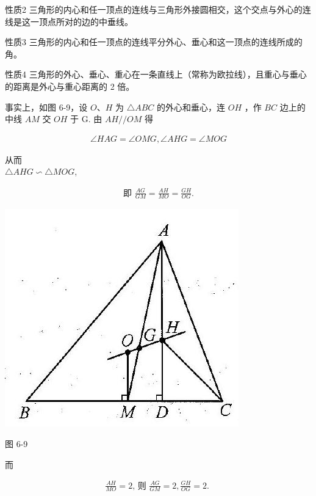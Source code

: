 \documentclass[10pt]{article}
\begin{document}
性质2 三角形的内心和任一顶点的连线与三角形外接圆相交，这个交点与外心的连线是这一顶点所对的边的中垂线。

性质3 三角形的内心和任一顶点的连线平分外心、垂心和这一顶点的连线所成的角。

性质4 三角形的外心、垂心、重心在一条直线上（常称为欧拉线），且重心与垂心的距离是外心与重心距离的 2 倍。

事实上，如图 6-9，设 $O 、 H$ 为 $\triangle A B C$ 的外心和垂心，连 $O H$ ，作 $B C$ 边上的中线 $A M$ 交 $O H$ 于 G. 由 $A H / / O M$ 得

\begin{align*}
\angle H A G=\angle O M G, \angle A H G=\angle M O G
\end{align*}

从而\\
$\triangle A H G \backsim \triangle M O G$,

\begin{align*}
\text { 即 } \frac{A G}{G M}=\frac{A H}{M O}=\frac{G H}{O G} \text {. }
\end{align*}

\begin{center}
\includegraphics[max width=\textwidth]{2024_10_30_2c8f45efd4a519b08e1ag-064(1)}
\end{center}

图 6-9

而

\begin{align*}
\frac{A H}{M O}=2 \text {, 则 } \frac{A G}{G M}=2, \frac{G H}{O G}=2 \text {. }
\end{align*}
\end{document}
